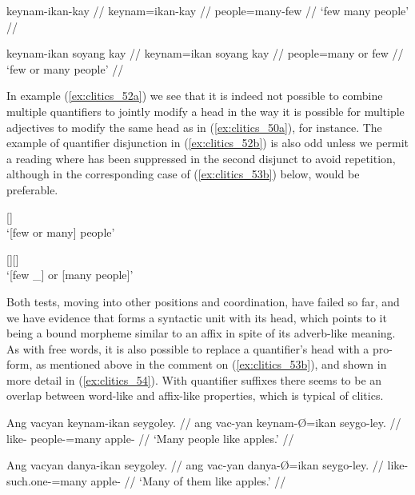 \pex\label{ex:clitics_52}
\a\label{ex:clitics_52a}\ljudge{*}\begingl
	\gla keynam-ikan-kay //
	\glb keynam=ikan-kay //
	\glc people=many-few //
	\glft `few many people' //
\endgl

\a\label{ex:clitics_52b}\ljudge{\ques}\begingl
	\gla keynam-ikan soyang kay //
	\glb keynam=ikan soyang kay //
	\glc people=many or few //
	\glft `few or many people' //
\endgl
\xe

In example (\ref{ex:clitics_52a}) we see that it is indeed not possible to
combine multiple quantifiers to jointly modify a head in the way it is possible
for multiple adjectives to modify the same head as in (\ref{ex:clitics_50a}),
for instance. The example of quantifier disjunction in (\ref{ex:clitics_52b})
is also odd unless we permit a reading where
 has been suppressed in the second disjunct to
avoid repetition, although in the corresponding case of (\ref{ex:clitics_53b})
below,  would be preferable.

\pex\label{ex:clitics_53}
\a\label{ex:clitics_53a}
	\ljudge{\ques} [] \\
		`[few or many] people'

\a\label{ex:clitics_53b}
	[][] \\
		`[few \_] or [many people]'
\xe

Both tests, moving  into other positions
and coordination, have failed so far, and we have evidence that
 forms a syntactic unit with its head, which points to it
being a bound morpheme similar to an affix in spite of its adverb-like meaning.
As with free words, it is also possible to replace a quantifier's head with a
pro-form, as mentioned above in the comment on (\ref{ex:clitics_53b}), and
shown in more detail in (\ref{ex:clitics_54}). With quantifier suffixes there
seems to be an overlap between word-like and affix-like properties, which is
typical of clitics.

\pex\label{ex:clitics_54}
\a\label{ex:clitics_54a}\begingl
	\gla Ang vacyan keynam-ikan seygoley. //
	\glb ang vac-yan keynam-Ø=ikan seygo-ley. //
	\glc \AgtT{} like-\TplM{} people-\Top{}=many apple-\PargI{} //
	\glft `Many people like apples.' //
\endgl

\a\label{ex:clitics_54b}\begingl
	\gla Ang vacyan danya-ikan seygoley. //
	\glb ang vac-yan danya-Ø=ikan seygo-ley. //
	\glc \AgtT{} like-\TplM{} such.one-\Top{}=many apple-\PargI{} //
	\glft `Many of them like apples.' //
\endgl

